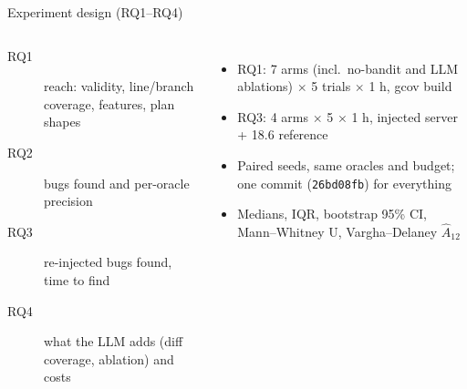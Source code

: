 \documentclass[aspectratio=169,11pt]{beamer}
\begin{document}
\begin{frame}{Experiment design (RQ1--RQ4)}
\begin{columns}[T]
\small
\begin{description}
  \item[RQ1] reach: validity, line/branch coverage, features, plan shapes
  \item[RQ2] bugs found and per-oracle precision
  \item[RQ3] re-injected bugs found, time to find
  \item[RQ4] what the LLM adds (diff coverage, ablation) and costs
\end{description}
\small
\begin{itemize}
  \item RQ1: 7 arms (incl.\ no-bandit and LLM ablations) $\times$ 5 trials $\times$ 1 h, gcov build
  \item RQ3: 4 arms $\times$ 5 $\times$ 1 h, injected server + 18.6 reference
  \item Paired seeds, same oracles and budget; one commit (\texttt{26bd08fb}) for everything
  \item Medians, IQR, bootstrap 95\% CI, Mann--Whitney U, Vargha--Delaney $\hat A_{12}$
\end{itemize}
\end{columns}
\end{frame}
\end{document}
